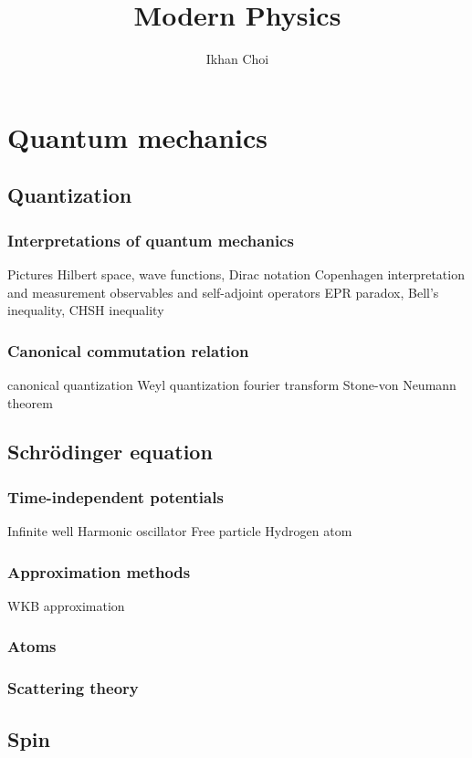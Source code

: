 \documentclass{../note}
\begin{document}
\title{Modern Physics}
\author{Ikhan Choi}
\maketitle
\tableofcontents

\part{Quantum mechanics}
\chapter{Quantization}
\section{Interpretations of quantum mechanics}
Pictures
Hilbert space, wave functions, Dirac notation
Copenhagen interpretation and measurement
observables and self-adjoint operators
EPR paradox, Bell's inequality, CHSH inequality
\section{Canonical commutation relation}
canonical quantization
Weyl quantization
fourier transform
Stone-von Neumann theorem

\chapter{Schr\"odinger equation}
\section{Time-independent potentials}
Infinite well
Harmonic oscillator
Free particle
Hydrogen atom
\section{Approximation methods}
WKB approximation
\section{Atoms}
\section{Scattering theory}

\chapter{Spin}
\end{document}
